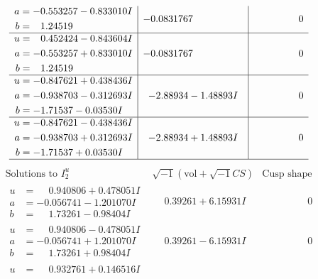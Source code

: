\documentclass[1p]{elsarticle_modified}
\theoremstyle{definition}
\newcommand{\I}{\sqrt{-1}}
\begin{document}
$$\begin{array}{c|c|c}
\begin{aligned}
a &= -0.553257 - 0.833010 I \\
b &= \phantom{-}1.24519\phantom{ +0.000000I}\end{aligned}
 & -0.0831767\phantom{ +0.000000I} & \phantom{-0.000000 } 0 \\ \hline\begin{aligned}
u &= \phantom{-}0.452424 - 0.843604 I \\
a &= -0.553257 + 0.833010 I \\
b &= \phantom{-}1.24519\phantom{ +0.000000I}\end{aligned}
 & -0.0831767\phantom{ +0.000000I} & \phantom{-0.000000 } 0 \\ \hline\begin{aligned}
u &= -0.847621 + 0.438436 I \\
a &= -0.938703 - 0.312693 I \\
b &= -1.71537 - 0.03530 I\end{aligned}
 & -2.88934 - 1.48893 I & \phantom{-0.000000 } 0 \\ \hline\begin{aligned}
u &= -0.847621 - 0.438436 I \\
a &= -0.938703 + 0.312693 I \\
b &= -1.71537 + 0.03530 I\end{aligned}
 & -2.88934 + 1.48893 I & \phantom{-0.000000 } 0\\
 \hline 
 \end{array}$$\newpage$$\begin{array}{c|c|c}  
\text{Solutions to }I^u_{2}& \I (\text{vol} + \sqrt{-1}CS) & \text{Cusp shape}\\
 \hline 
\begin{aligned}
u &= \phantom{-}0.940806 + 0.478051 I \\
a &= -0.056741 - 1.201070 I \\
b &= \phantom{-}1.73261 - 0.98404 I\end{aligned}
 & \phantom{-}0.39261 + 6.15931 I & \phantom{-0.000000 } 0 \\ \hline\begin{aligned}
u &= \phantom{-}0.940806 - 0.478051 I \\
a &= -0.056741 + 1.201070 I \\
b &= \phantom{-}1.73261 + 0.98404 I\end{aligned}
 & \phantom{-}0.39261 - 6.15931 I & \phantom{-0.000000 } 0 \\ \hline\begin{aligned}
u &= \phantom{-}0.932761 + 0.146516 I \\

\end{aligned}
\end{array}$$
\end{document}

